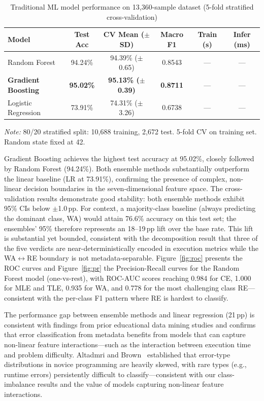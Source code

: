 \documentclass[acmsmall]{acmart}
\begin{document}
\begin{table}[htbp]
\centering
\caption{Traditional ML model performance on 13,360-sample dataset
         (5-fold stratified cross-validation)}
\label{tab:ml-results}
\begin{tabular}{@{}lccccc@{}}
\toprule
Model & Test Acc & CV Mean ($\pm$SD) & Macro F1 & Train (s) & Infer (ms) \\
\midrule
Random Forest       & 94.24\% & 94.39\% ($\pm$0.65) & 0.8543 & --- & --- \\
\textbf{Gradient Boosting}   & \textbf{95.02\%} & \textbf{95.13\% ($\pm$0.39)} & \textbf{0.8711} & --- & --- \\
Logistic Regression & 73.91\% & 74.31\% ($\pm$3.26) & 0.6738 & --- & --- \\
\bottomrule
\end{tabular}

\vspace{2mm}
{\small \textit{Note:} 80/20 stratified split: 10,688 training, 2,672 test.
5-fold CV on training set. Random state fixed at 42.}
\end{table}

Gradient Boosting achieves the highest test accuracy at 95.02\%, closely
followed by Random Forest (94.24\%). Both ensemble methods substantially
outperform the linear baseline (LR at 73.91\%), confirming the presence of
complex, non-linear decision boundaries in the seven-dimensional feature
space. The cross-validation results demonstrate good stability: both ensemble
methods exhibit 95\% CIs below $\pm$1.0\,pp. For context, a
majority-class baseline (always predicting the dominant class, WA) would
attain 76.6\% accuracy on this test set; the ensembles' 95\% therefore
represents an 18--19\,pp lift over the base rate. This lift is substantial
yet bounded, consistent with the decomposition result that three of the five
verdicts are near-deterministically encoded in execution metrics while the
WA$\leftrightarrow$RE boundary is not metadata-separable.
Figure~\ref{fig:roc} presents the ROC curves and Figure~\ref{fig:pr} the
Precision-Recall curves for the Random Forest model (one-vs-rest), with
ROC-AUC scores reaching 0.984 for CE, 1.000 for MLE and TLE, 0.935 for WA,
and 0.778 for the most challenging class RE---consistent with the per-class F1
pattern where RE is hardest to classify.

The performance gap between ensemble methods and linear regression (21\,pp)
is consistent with findings from prior educational data mining studies
and confirms that error classification from metadata benefits from models
that can capture non-linear feature interactions---such as the interaction
between execution time and problem difficulty. Altadmri and Brown~\cite{altadmri2015most} established that error-type
distributions in novice programming are heavily skewed, with rare types
(e.g., runtime errors) persistently difficult to classify---consistent with
our class-imbalance results and the value of models capturing non-linear
feature interactions.
\end{document}
